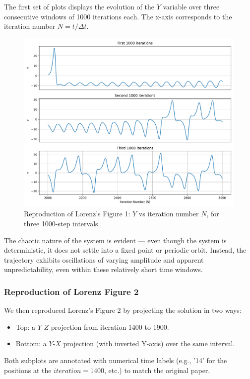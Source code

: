 \documentclass[12pt]{article}
\begin{document}
The first set of plots displays the evolution of the \( Y \) variable over three consecutive windows of 1000 iterations each. The x-axis corresponds to the iteration number \( N = t / \Delta t \).

\begin{figure}[H]
    \centering
    \includegraphics[width=\textwidth]{lorenz_figure1.pdf}
    \caption{Reproduction of Lorenz's Figure 1: $Y$ vs iteration number $N$, for three 1000-step intervals.}
\end{figure}

The chaotic nature of the system is evident — even though the system is deterministic, it does not settle into a fixed point or periodic orbit. Instead, the trajectory exhibits oscillations of varying amplitude and apparent unpredictability, even within these relatively short time windows.

\subsubsection*{Reproduction of Lorenz Figure 2}

We then reproduced Lorenz's Figure 2 by projecting the solution in two ways:
\begin{itemize}
    \item Top: a $Y$-$Z$ projection from iteration 1400 to 1900.
    \item Bottom: a $Y$-$X$ projection (with inverted Y-axis) over the same interval.
\end{itemize}
Both subplots are annotated with numerical time labels (e.g., '14' for the positions at the \( iteration=1400 \), etc.) to match the original paper.
\end{document}
